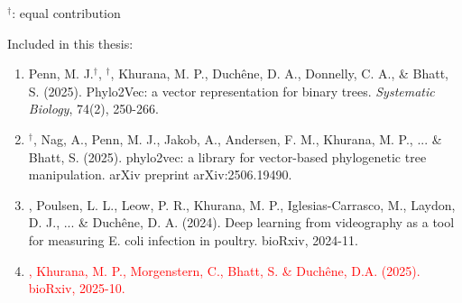 
$^{\dagger}$: equal contribution

Included in this thesis:

\begin{enumerate}[noitemsep, topsep=0pt]
    \item Penn, M. J.$^{\dagger}$, $^{\dagger}$, Khurana, M. P., Duchêne, D. A., Donnelly, C. A., \& Bhatt, S. (2025). Phylo2Vec: a vector representation for binary trees.\textit{ Systematic Biology}, 74(2), 250-266.
    \item {}$^{\dagger}$, Nag, A., Penn, M. J., Jakob, A., Andersen, F. M., Khurana, M. P., ... \& Bhatt, S. (2025). phylo2vec: a library for vector-based phylogenetic tree manipulation. arXiv preprint arXiv:2506.19490.
    \item {}, Poulsen, L. L., Leow, P. R., Khurana, M. P., Iglesias-Carrasco, M., Laydon, D. J., ... \& Duchêne, D. A. (2024). Deep learning from videography as a tool for measuring E. coli infection in poultry. bioRxiv, 2024-11.
    \item \textcolor{red}{, Khurana, M. P., Morgenstern, C., Bhatt, S. \& Duchêne, D.A. (2025).  bioRxiv, 2025-10.}
\end{enumerate}

